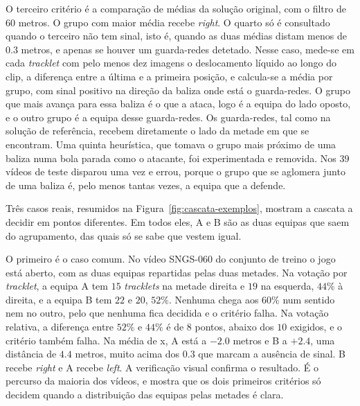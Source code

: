 O terceiro critério é a comparação de médias da solução original, com o filtro de $60$ metros. O
grupo com maior média recebe \emph{right}. O quarto só é consultado quando o terceiro não tem
sinal, isto é, quando as duas médias distam menos de $0.3$ metros, e apenas se houver um
guarda-redes detetado. Nesse caso, mede-se em cada \emph{tracklet} com pelo menos dez imagens o
deslocamento líquido ao longo do clip, a diferença entre a última e a primeira posição, e
calcula-se a média por grupo, com sinal positivo na direção da baliza onde está o guarda-redes.
O grupo que mais avança para essa baliza é o que a ataca, logo é a equipa do lado oposto, e o
outro grupo é a equipa desse guarda-redes. Os guarda-redes, tal como na solução de referência,
recebem diretamente o lado da metade em que se encontram. Uma quinta heurística, que tomava o grupo
mais próximo de uma baliza numa bola parada como o atacante, foi experimentada e removida. Nos $39$
vídeos de teste disparou uma vez e errou, porque o grupo que se aglomera junto de uma baliza é,
pelo menos tantas vezes, a equipa que a defende.

Três casos reais, resumidos na Figura~\ref{fig:cascata-exemplos}, mostram a cascata a decidir em
pontos diferentes. Em todos eles, A e B são as duas equipas que saem do agrupamento, das quais só
se sabe que vestem igual.

O primeiro é o caso comum. No vídeo SNGS-060 do conjunto de treino o jogo está aberto, com as duas
equipas repartidas pelas duas metades. Na votação por \emph{tracklet}, a equipa A tem $15$
\emph{tracklets} na metade direita e $19$ na esquerda, $44\%$ à direita, e a equipa B tem $22$ e
$20$, $52\%$. Nenhuma chega aos $60\%$ num sentido nem no outro, pelo que nenhuma fica decidida e o
critério falha. Na votação relativa, a diferença entre $52\%$ e $44\%$ é de $8$ pontos, abaixo dos
$10$ exigidos, e o critério também falha. Na média de x, A está a $-2.0$ metros e B a $+2.4$, uma
distância de $4.4$ metros, muito acima dos $0.3$ que marcam a ausência de sinal. B recebe
\emph{right} e A recebe \emph{left}. A verificação visual confirma o resultado. É o percurso da
maioria dos vídeos, e mostra que os dois primeiros critérios só decidem quando a distribuição das
equipas pelas metades é clara.

